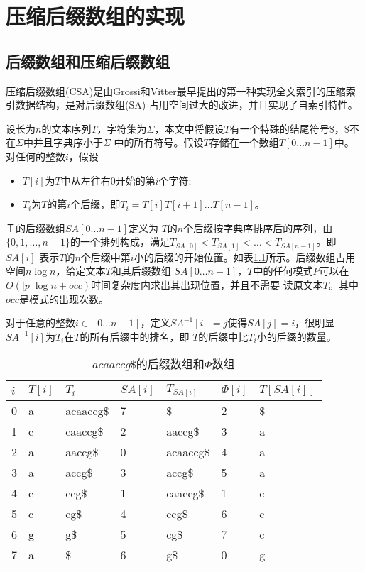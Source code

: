 \chapter{压缩后缀数组的实现}

\section{后缀数组和压缩后缀数组}
压缩后缀数组(CSA)是由Grossi和Vitter\cite{grossi2005compressed}最早提出的第一种实现全文索引的压缩索引数据结构，是对后缀数组(SA)
\cite{manber1993suffix}占用空间过大的改进，并且实现了自索引特性。

设长为$n$的文本序列$T$，字符集为$\Sigma$，本文中将假设$T$有一个特殊的结尾符号$\$$，$\$$不在$\Sigma$中并且字典序小于$\Sigma$
中的所有符号。假设$T$存储在一个数组$T[0\ldots n-1]$中。对任何的整数$i$，假设
\begin{itemize}
    \item $T[i]$为$T$中从左往右0开始的第$i$个字符;
    \item $T_i$为$T$的第$i$个后缀，即$T_i=T[i]T[i+1]\ldots T[n-1]$。
\end{itemize}

$Ｔ$的后缀数组$SA[0\ldots n-1]$定义为
$T$的$n$个后缀按字典序排序后的序列，由$\{0,1,\ldots, n-1\}$的一个排列构成，满足$T_{SA[0]}<T_{SA[1]}<\ldots<T_{SA[n-1]}$。即$SA[i]$
表示$T$的$n$个后缀中第$i$小的后缀的开始位置。如表\ref{tab:tabsuffix}所示。后缀数组占用空间$n\log n$，给定文本$T$和其后缀数组
$SA[0\ldots n-1]$，$T$中的任何模式$P$可以在$O(|p|\log n+occ)$时间复杂度内求出其出现位置\cite{manber1993suffix}，并且不需要
读原文本$T$。其中$occ$是模式的出现次数。

对于任意的整数$i \in [0\ldots n-1]$，定义$SA^{-1}[i]=j$使得$SA[j]=i$，很明显$SA^{-1}[i]$为$T_i$在$T$的所有后缀中的排名，即
$T$的后缀中比$T_i$小的后缀的数量。

\begin{table}[htbp]
    \caption{$acaaccg\$$的后缀数组和$\Phi$数组}
    \label{tab:tabsuffix}
    \centering
    \begin{tabular}{lllllll}
        \toprule
        $i$&$T[i]$&$T_i$&$SA[i]$&$T_{SA[i]}$&$\Phi[i]$&$T[SA[i]]$\\
        \midrule
        0&a&acaaccg\$&7&\$&2&\$\\
        1&c&caaccg\$&2&aaccg\$&3&a\\
        2&a&aaccg\$&0&acaaccg\$&4&a\\
        3&a&accg\$&3&accg\$&5&a\\
        4&c&ccg\$&1&caaccg\$&1&c\\
        5&c&cg\$&4&ccg\$&6&c\\
        6&g&g\$&5&cg\$&7&c\\
        7&a&\$&6&g\$&0&g\\
        \bottomrule
    \end{tabular}
\end{table}

